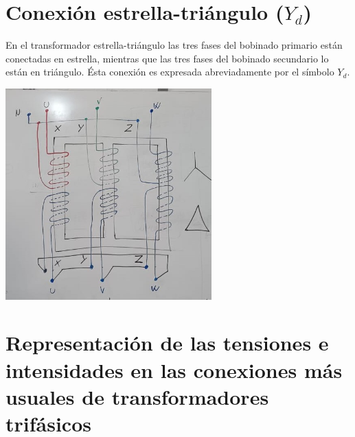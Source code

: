 \documentclass[11pt]{report}
\begin{document}
\section{Conexión estrella-triángulo ($Y_d$)}
En el transformador estrella-triángulo las tres fases del bobinado primario
están conectadas en estrella, mientras que las tres fases del bobinado
secundario lo están en triángulo. Ésta conexión es expresada
abreviadamente por el símbolo $Y_d$.

\begin{center}
  \includegraphics[width=300px]{trafo-conexion-yd.jpeg}
\end{center}

\section{Representación de las tensiones e intensidades en las conexiones más
  usuales de transformadores trifásicos}
\end{document}

